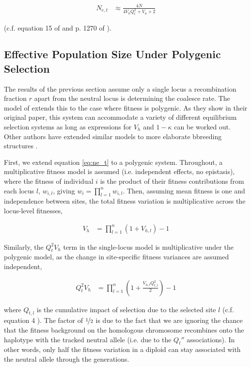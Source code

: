 \documentclass[11pt]{article}
\newcommand{\E}{\mathbb{E}}
\newcommand{\V}{\text{V}}
\begin{document}
\begin{align}
  \label{eq:ne_t}
  N_{e,t} &\approx \frac{4N}{4 V_h Q_t^2 +V_n+2}
\end{align}

(c.f. equation 15 of \cite{Santiago1995-hx} and p. 1270 of \cite{Santiago2016-mu}).


\subsection*{Effective Population Size Under Polygenic Selection}

The results of the previous section assume only a single locus a recombination
fraction $r$ apart from the neutral locus is determining the coalesce rate. The
model of \textcite{Santiago1998-bs} extends this to the case where fitness is
polygenic. As they show in their original paper, this system can accommodate a
variety of different equilibrium selection systems as long as expressions for
$V_h$ and $1-\kappa$ can be worked out. Other authors have extended similar models to
more elaborate bbreeding structures \parencite{Wray1990-zf,Woolliams1993-qo}.

First, we extend equation \eqref{eq:ne_t} to a polygenic system. Throughout, a
multiplicative fitness model is assumed (i.e. independent effects, no
epistasis), where the fitness of individual $i$ is the product of their fitness
contributions from each locus $l$, $w_{i,l}$, giving $w_i = \prod_{l=1}^n
w_{i,l}$. Then, assuming mean fitness is one and independence between sites,
the total fitness variation is multiplicative across the locus-level fitnesses,

\begin{align}
  V_h %
      &= \prod_{l=1}^n (1 + V_{h,l})  - 1
\end{align}

Similarly, the $Q_t^2 V_h$ term in the single-locus model is multiplicative
under the polygenic model, as the change in site-specific fitness variances are
assumed independent,

\begin{align}
  Q_t^2 V_h &= \prod_{l=1}^n \left(1 + \frac{V_{h,l} Q_{t,l}^2}{2}\right)  - 1
\end{align}

where $Q_{t,l}$ is the cumulative impact of selection due to the selected site
$l$ (c.f. equation 4 \cite{Santiago1998-bs}). The factor of $\nicefrac{1}{2}$
is due to the fact that we are ignoring the chance that the fitness background
on the homologous chromosome recombines onto the haplotype with the tracked
neutral allele (i.e. due to the $Q_t''$ associations). In other words, only
half the fitness variation in a diploid can stay associated with the neutral
allele through the generations.
\end{document}
